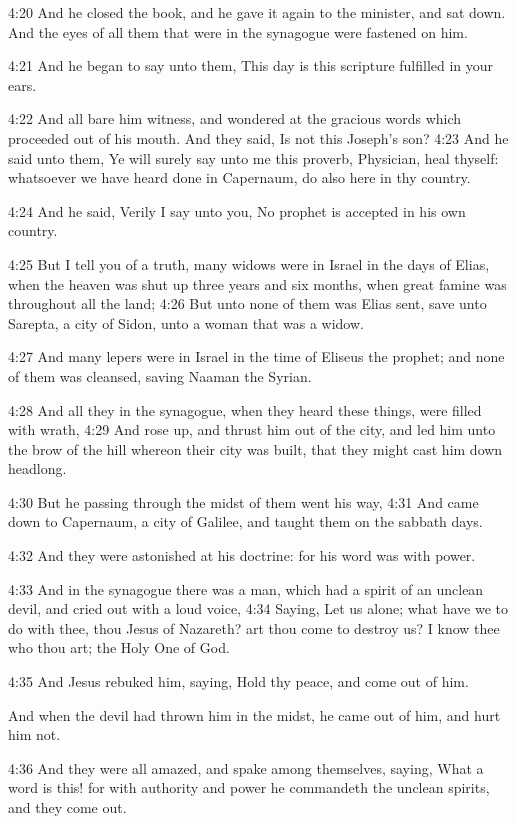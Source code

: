 4:20 And he closed the book, and he gave it again to the minister, and sat down. And the eyes of all them that were in the synagogue were fastened on him.

4:21 And he began to say unto them, This day is this scripture fulfilled in your ears.

4:22 And all bare him witness, and wondered at the gracious words which proceeded out of his mouth. And they said, Is not this Joseph's son?  4:23 And he said unto them, Ye will surely say unto me this proverb, Physician, heal thyself: whatsoever we have heard done in Capernaum, do also here in thy country.

4:24 And he said, Verily I say unto you, No prophet is accepted in his own country.

4:25 But I tell you of a truth, many widows were in Israel in the days of Elias, when the heaven was shut up three years and six months, when great famine was throughout all the land; 4:26 But unto none of them was Elias sent, save unto Sarepta, a city of Sidon, unto a woman that was a widow.

4:27 And many lepers were in Israel in the time of Eliseus the prophet; and none of them was cleansed, saving Naaman the Syrian.

4:28 And all they in the synagogue, when they heard these things, were filled with wrath, 4:29 And rose up, and thrust him out of the city, and led him unto the brow of the hill whereon their city was built, that they might cast him down headlong.

4:30 But he passing through the midst of them went his way, 4:31 And came down to Capernaum, a city of Galilee, and taught them on the sabbath days.

4:32 And they were astonished at his doctrine: for his word was with power.

4:33 And in the synagogue there was a man, which had a spirit of an unclean devil, and cried out with a loud voice, 4:34 Saying, Let us alone; what have we to do with thee, thou Jesus of Nazareth? art thou come to destroy us? I know thee who thou art; the Holy One of God.

4:35 And Jesus rebuked him, saying, Hold thy peace, and come out of him.

And when the devil had thrown him in the midst, he came out of him, and hurt him not.

4:36 And they were all amazed, and spake among themselves, saying, What a word is this! for with authority and power he commandeth the unclean spirits, and they come out.

